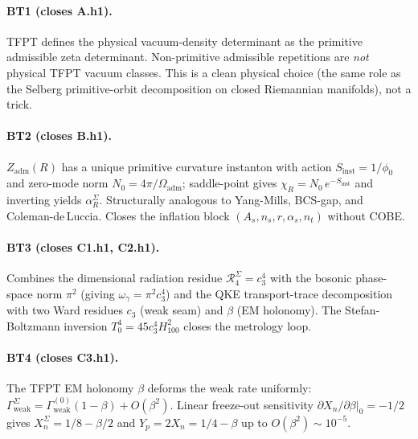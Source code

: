 \paragraph{BT1 (closes A.h1).}  TFPT defines the physical vacuum-density
determinant as the primitive admissible zeta determinant.
Non-primitive admissible repetitions are \emph{not} physical TFPT
vacuum classes.  This is a clean physical choice (the same role as
the Selberg primitive-orbit decomposition on closed Riemannian
manifolds), not a trick.

\paragraph{BT2 (closes B.h1).}  \(Z_{\mathrm{adm}}(R)\) has a unique
primitive curvature instanton with action \(S_{\mathrm{inst}}=1/\phi_0\)
and zero-mode norm \(N_0=4\pi/\Omega_{\mathrm{adm}}\); saddle-point
gives \(\chi_R=N_0\,e^{-S_{\mathrm{inst}}}\) and inverting yields
\(\alpha_R^\Sigma\).  Structurally analogous to Yang-Mills,
BCS-gap, and Coleman-de\,Luccia.  Closes the inflation block
\((A_s,n_s,r,\alpha_s,n_t)\) without COBE.

\paragraph{BT3 (closes C1.h1, C2.h1).}  Combines the dimensional
radiation residue \(\mathcal R_4^\Sigma=c_3^4\) with the bosonic
phase-space norm \(\pi^2\) (giving \(\omega_\gamma=\pi^2 c_3^4\)) and
the QKE transport-trace decomposition with two Ward residues
\(c_3\) (weak seam) and \(\beta\) (EM holonomy).  The Stefan-Boltzmann
inversion \(T_0^4=45 c_3^4 H_{100}^2\) closes the metrology loop.

\paragraph{BT4 (closes C3.h1).}  The TFPT EM holonomy \(\beta\)
deforms the weak rate uniformly: \(\Gamma_{\mathrm{weak}}^\Sigma=
\Gamma_{\mathrm{weak}}^{(0)}(1-\beta)+O(\beta^2)\).  Linear freeze-out
sensitivity \(\partial X_n/\partial\beta\bigr|_0=-1/2\) gives
\(X_n^\Sigma=1/8-\beta/2\) and \(Y_p=2X_n=1/4-\beta\) up to
\(O(\beta^2)\sim 10^{-5}\).

